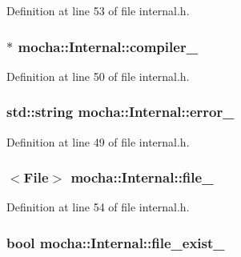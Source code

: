 Definition at line 53 of file internal.h.

\hypertarget{classmocha_1_1_internal_ae20e32b51b17a60782e14bfbd5eddf93}{
\subsubsection[{compiler\_\-}]{$\ast$ {\bf mocha::Internal::compiler\_\-}}}
\label{classmocha_1_1_internal_ae20e32b51b17a60782e14bfbd5eddf93}


Definition at line 50 of file internal.h.

\hypertarget{classmocha_1_1_internal_ac701005cf899132836fe980a64715353}{
\subsubsection[{error\_\-}]{\setlength{\rightskip}{0pt plus 5cm}std::string {\bf mocha::Internal::error\_\-}}}
\label{classmocha_1_1_internal_ac701005cf899132836fe980a64715353}


Definition at line 49 of file internal.h.

\hypertarget{classmocha_1_1_internal_af70a5ac87611f52380bbe0e7da0c7d99}{
\subsubsection[{file\_\-}]{$<${\bf File}$>$ {\bf mocha::Internal::file\_\-}}}
\label{classmocha_1_1_internal_af70a5ac87611f52380bbe0e7da0c7d99}


Definition at line 54 of file internal.h.

\hypertarget{classmocha_1_1_internal_aee7ebdb2e4620bc81cb165d6d966c369}{
\subsubsection[{file\_\-exist\_\-}]{\setlength{\rightskip}{0pt plus 5cm}bool {\bf mocha::Internal::file\_\-exist\_\-}}}
\label{classmocha_1_1_internal_aee7ebdb2e4620bc81cb165d6d966c369}


